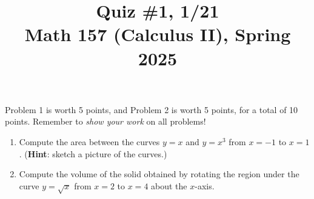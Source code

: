 \documentclass[11pt]{article}
\title{Quiz \#1, 1/21 \\ Math 157 (Calculus II), Spring 2025}
\date{}
\begin{document}
\maketitle

\thispagestyle{empty}

\vspace{-2cm}

Problem 1 is worth 5 points, and Problem 2 is worth 5 points, for a total of 10 points. Remember to \emph{show your work} on all problems!

\begin{enumerate}
\item Compute the area between the curves $y=x$ and $y=x^3$ from $x=-1$ to $x=1$. ({\bf Hint}: sketch a picture of the curves.)

\vspace{8cm}

\item Compute the volume of the solid obtained by rotating the region under the curve $y=\sqrt{x}$ from $x=2$ to $x=4$ about the $x$-axis.

\end{enumerate}
\end{document}
